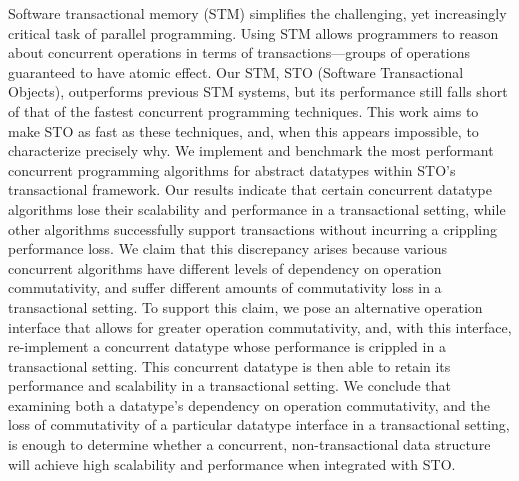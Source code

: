 Software transactional memory (STM) simplifies the challenging, yet increasingly critical task of parallel programming. Using STM allows programmers to reason about concurrent operations in terms of transactions---groups of operations guaranteed to have atomic effect. Our STM, STO (Software Transactional Objects), outperforms previous STM systems, but its performance still falls short of that of the fastest concurrent programming techniques. This work aims to make STO as fast as these techniques, and, when this appears impossible, to characterize precisely why. 
We implement and benchmark the most performant concurrent programming algorithms for abstract datatypes within STO's transactional framework. Our results indicate that certain concurrent datatype algorithms lose their scalability and performance in a transactional setting, while other algorithms successfully support transactions without incurring a crippling performance loss. We claim that this discrepancy arises because various concurrent algorithms have different levels of dependency on operation commutativity, and suffer different amounts of commutativity loss in a transactional setting. To support this claim, we pose an alternative operation interface that allows for greater operation commutativity, and, with this interface, re-implement a concurrent datatype whose performance is crippled in a transactional setting. This concurrent datatype is then able to retain its performance and scalability in a transactional setting.
We conclude that examining both a datatype's dependency on operation commutativity, and the loss of commutativity of a particular datatype interface in a transactional setting, is enough to determine whether a concurrent, non-transactional data structure will achieve high scalability and performance when integrated with STO.
